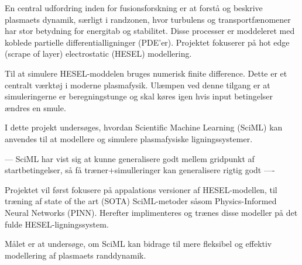 



En central udfordring inden for fusionsforskning er at forstå og beskrive plasmaets dynamik, 
særligt i randzonen, hvor turbulens og transportfænomener har stor betydning for energitab og stabilitet.
Disse processer er moddeleret med koblede partielle differentialligninger (PDE'er). 
Projektet fokuserer på hot edge (scrape of layer) electrostatic (HESEL) modellering. 


Til at simulere HESEL-moddelen bruges numerisk finite difference. Dette er et centralt værktøj i moderne plasmafysik.
Ulæmpen ved denne tilgang er at simuleringerne er beregningstunge og skal køres igen hvis input betingelser ændres en smule.

I dette projekt undersøges, hvordan Scientific Machine Learning (SciML) kan anvendes 
til at modellere og simulere plasmafysiske ligningssystemer. 

--- SciML har vist sig at kunne generalisere godt mellem gridpunkt af startbetingelser, så få træner+simulleringer kan generalisere rigtig godt ----

Projektet vil først fokusere på appalations versioner af HESEL-modellen,
til træning af state of the art (SOTA) SciML-metoder såsom Physics-Informed Neural Networks (PINN).
Herefter implimenteres og trænes disse modeller på det fulde HESEL-ligningssystem.

Målet er at undersøge, om SciML kan bidrage til mere fleksibel og effektiv modellering af 
plasmaets randdynamik.